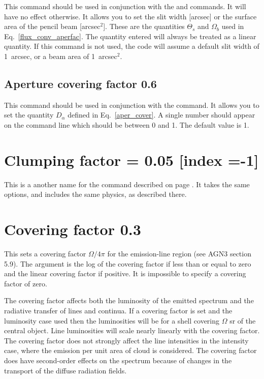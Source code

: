 This command should be used in conjunction with the  and  commands. It will have no
effect otherwise. It allows you to set the slit width [arcsec] or the surface
area of the pencil beam [arcsec$^2$]. These are the quantities $\Theta_s$ and
$\Omega_b$ used in Eq.~\ref{flux_conv_aperfac}. The quantity entered will
always be treated as a linear quantity. If this command is not used, the code
will assume a default slit width of 1~arcsec, or a beam area of 1~arcsec$^2$.

\subsection{Aperture covering factor 0.6}

This command should be used in conjunction with the  command. It allows you to set the quantity $D_\alpha$ defined in
Eq.~\ref{aper_cover}. A single number should appear on the command line
which should be between 0 and 1. The default value is 1.

\section{Clumping factor = 0.05 [index =-1]}
This is a another name for the
 command described on
page \pageref{sec:CommandFillingFactor}.
It takes the same options, and includes the same physics,
as described there.

\section{Covering factor 0.3}
\label{cov_factor}

This sets a covering factor $\Omega/4\pi$ for the emission-line region
(see AGN3 section 5.9).
The argument is the log of the covering factor
if less than or equal to zero and the linear covering factor if positive.
It is impossible to specify a covering factor of zero.

The covering factor affects both the luminosity of the emitted spectrum
and the radiative transfer of lines and continua.
If a covering factor
is set and the luminosity case used then the luminosities
will be for a shell covering $\Omega$ sr of the central object.
Line luminosities
will scale nearly linearly with the covering factor.
The covering factor
does not strongly affect the line intensities in the intensity case, where
the emission per unit area of cloud is considered.
The covering factor
does have second-order effects on the spectrum because of changes in the
transport of the diffuse radiation fields.

